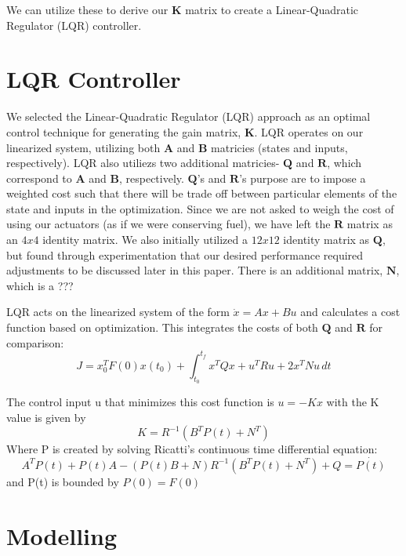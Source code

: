 \documentclass{article}
\begin{document}
\begin{multicols}{2}
We can utilize these to derive our $\boldsymbol{K}$ matrix to create a Linear-Quadratic Regulator (LQR) controller.

\section*{LQR Controller}
We selected the Linear-Quadratic Regulator (LQR) approach as an optimal control technique for generating the gain matrix, $\boldsymbol{K}$.  LQR operates on our linearized system, utilizing both $\boldsymbol{A}$ and $\boldsymbol{B}$ matricies (states and inputs, respectively). LQR also utiliezs two additional matricies- $\boldsymbol{Q}$ and $\boldsymbol{R}$, which correspond to $\boldsymbol{A}$ and $\boldsymbol{B}$, respectively. $\boldsymbol{Q}$'s and $\boldsymbol{R}$'s purpose are to impose a weighted cost such that there will be trade off between particular elements of the state and inputs in the optimization. Since we are not asked to weigh the cost of using our actuators (as if we were conserving fuel), we have left the $\boldsymbol{R}$ matrix as an $4x4$ identity matrix. We also initially utilized a $12x12$ identity matrix as $\boldsymbol{Q}$, but found through experimentation that our desired performance required adjustments to be discussed later in this paper. There is an additional matrix, $\boldsymbol{N}$, which is a ???

LQR acts on the linearized system of the form $\dot{x} = Ax + Bu$ and calculates a cost function based on optimization.  This integrates the costs of both $\boldsymbol{Q}$ and $\boldsymbol{R}$ for comparison:
\begin{equation}
J =x_0^TF(0)x(t_0) +  \int_{t_0}^{t_f} x^TQx+u^TRu +2x^TNu\,dt 
\end{equation}

The control input u that minimizes this cost function is $u= -Kx$ with the K value is given by
\begin{equation}
K = R^{-1}(B^TP(t) + N^T)
\end{equation}
\noindent
Where P is created by solving Ricatti's continuous time differential equation:
\begin{equation}
A^TP(t) + P(t)A - (P(t)B + N)R^{-1}(B^TP(t) + N^T) + Q = \dot{P(t)}
\end{equation}
\noindent
and P(t) is bounded by $P(0) = F(0)$\\

\bigskip
\section*{Modelling}


\end{multicols}
\end{document}
